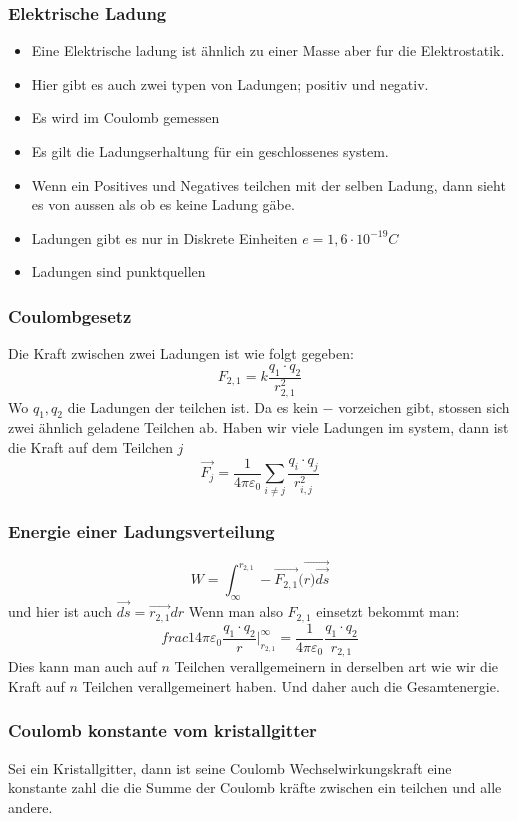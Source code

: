 \documentclass{article}
\begin{document}
\subsubsection{Elektrische Ladung}\begin{multicols}{2} \begin{itemize}\item{Eine Elektrische ladung ist ähnlich zu einer Masse aber fur die Elektrostatik.} \item{Hier gibt es auch zwei typen von Ladungen; positiv und negativ.} \item{Es wird im Coulomb gemessen} \item{Es gilt die Ladungserhaltung für ein geschlossenes system.} \item{Wenn ein Positives und Negatives teilchen mit der selben Ladung, dann sieht es von aussen als ob es keine Ladung gäbe.} \item{Ladungen gibt es nur in Diskrete Einheiten $e=1,6\cdot10^{-19}C$}\item{Ladungen sind punktquellen}\end{itemize}\end{multicols}
\subsubsection{Coulombgesetz} Die Kraft zwischen zwei Ladungen ist wie folgt gegeben:\[F_{2,1}=k\frac{q_1\cdot q_2}{r_{2,1}^2}\]Wo $q_1, q_2$ die Ladungen der teilchen ist. Da es kein $-$ vorzeichen gibt, stossen sich zwei ähnlich geladene Teilchen ab.
\newline Haben wir viele Ladungen im system, dann ist die Kraft auf dem Teilchen $j$ \[\vec{F_{j}}=\frac{1}{4\pi\varepsilon_0}\sum_{i\neq j}\frac{q_i\cdot q_j}{r_{i,j}^2}\]
\subsubsection{Energie einer Ladungsverteilung} \[W=\int_\infty^{r_{2,1}}-\vec{F_{2,1}}(\vec{r)\vec{ds}}\] und hier ist auch $\vec{ds}=\vec{r_{2,1}}dr$ Wenn man also $F_{2,1}$ einsetzt bekommt man:\[frac{1}{4\pi\varepsilon_0}\frac{q_1\cdot q_2}{r}\left.\right|^\infty_{r_{2,1}}=\frac{1}{4\pi\varepsilon_0}\frac{q_1\cdot q_2}{r_{2,1}}\]
  Dies kann man auch auf $n$ Teilchen verallgemeinern in derselben art wie wir die Kraft auf $n$ Teilchen verallgemeinert haben. Und daher auch die Gesamtenergie.
\subsubsection{Coulomb konstante vom kristallgitter} Sei ein Kristallgitter, dann ist seine Coulomb Wechselwirkungskraft eine konstante zahl die die Summe der Coulomb kräfte zwischen ein teilchen und alle andere.
\end{document}
